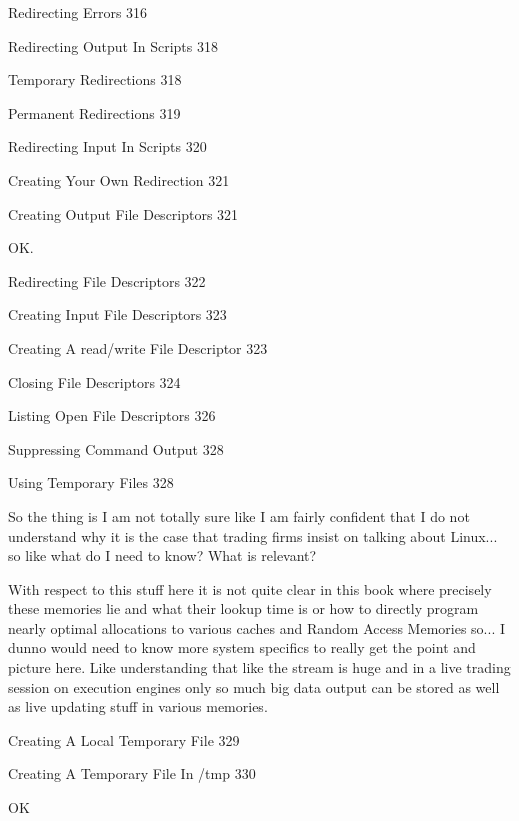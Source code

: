 Redirecting Errors 316



Redirecting Output In Scripts 318



Temporary Redirections 318



Permanent Redirections 319



Redirecting Input In Scripts 320



Creating Your Own Redirection 321



Creating Output File Descriptors 321

OK.

Redirecting File Descriptors 322



Creating Input File Descriptors 323



Creating A read/write File Descriptor 323



Closing File Descriptors 324



Listing Open File Descriptors 326



Suppressing Command Output 328



Using Temporary Files 328

So the thing is I am not totally sure like I am fairly confident that I do not understand why it is the case that trading firms insist on talking about Linux... so like what do I need to know? What is relevant?

With respect to this stuff here it is not quite clear in this book where precisely these memories lie and what their lookup time is or how to directly program nearly optimal allocations to various caches and Random Access Memories so... I dunno would need to know more system specifics to really get the point and picture here. Like understanding that like the stream is huge and in a live trading session on execution engines only so much big data output can be stored as well as live updating stuff in various memories.

Creating A Local Temporary File 329



Creating A Temporary File In /tmp 330

OK


